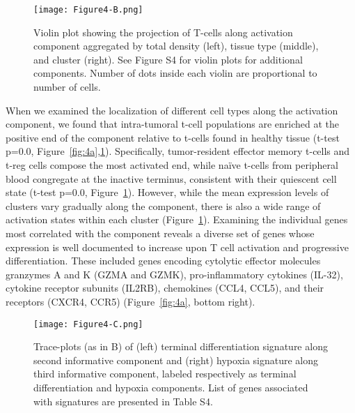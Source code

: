\begin{figure}
\centering
\texttt{[image: Figure4-B.png]}
\caption{Violin plot showing the projection of T-cells along activation component aggregated by total density (left), tissue type (middle), and cluster (right).
See Figure S4 for violin plots for additional components.
Number of dots inside each violin are proportional to number of cells.}
\label{fig:4b}
\end{figure}

When we examined the localization of different cell types along the activation component, we found that intra-tumoral t-cell populations are enriched at the positive end of the component relative to t-cells found in healthy tissue (t-test p=0.0, Figure~\ref{fig:4a},\ref{fig:4b}).
Specifically, tumor-resident effector memory t-cells and t-reg cells compose the most activated end, while naïve t-cells from peripheral blood congregate at the inactive terminus, consistent with their quiescent cell state (t-test p=0.0, Figure~\ref{fig:4b}).
However, while the mean expression levels of clusters vary gradually along the component, there is also a wide range of activation states within each cluster (Figure~\ref{fig:4b}).
Examining the individual genes most correlated with the component reveals a diverse set of genes whose expression is well documented to increase upon T cell activation and progressive differentiation.
These included genes encoding cytolytic effector molecules granzymes A and K (GZMA and GZMK), pro-inflammatory cytokines (IL-32), cytokine receptor subunits (IL2RB), chemokines (CCL4, CCL5), and their receptors (CXCR4, CCR5) (Figure~\ref{fig:4a}, bottom right).
\begin{figure}
\centering
\texttt{[image: Figure4-C.png]}
\caption{Trace-plots (as in B) of (left) terminal differentiation signature along second informative component and (right) hypoxia signature along third informative component, labeled respectively as terminal differentiation and hypoxia components.
List of genes associated with signatures are presented in Table S4.}
\label{fig:4c}
\end{figure}

